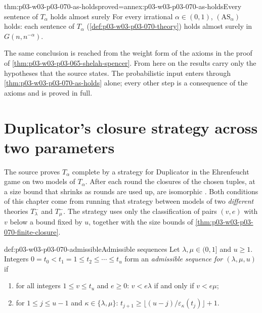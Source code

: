 \begin{hbtheorem}{thm:p03-w03-p03-070-as-holds}{proved=annex:p03-w03-p03-070-as-holds}{Every sentence of \(T_\alpha\) holds almost surely}
For every irrational \(\alpha\in(0,1)\), \((\mathrm{AS}_\alpha)\) holds: each
sentence of \(T_\alpha\) (\cref{def:p03-w03-p03-070-theory}) holds almost
surely in \(G(n,n^{-\alpha})\).
\end{hbtheorem}

The same conclusion is reached from the weight form of the axioms in the
proof of \cref{thm:p03-w03-p03-065-shelah-spencer}.  From here on the results
carry only the hypotheses that the source states.  The probabilistic input
enters through \cref{thm:p03-w03-p03-070-as-holds} alone; every other step is
a consequence of the axioms and is proved in full.

\section{Duplicator's closure strategy across two parameters}
\label{sec:p03-w03-p03-070-strategy}

The source proves \(T_\alpha\) complete by a strategy for Duplicator in the
Ehrenfeucht game on two models of \(T_\alpha\).  After each round the
closures of the chosen tuples, at a size bound that shrinks as rounds are
used up, are isomorphic \cite[pp.~11--12]{Spencer2007LogicRandomStructuresAuthor}.
Both conditions of this chapter come from running that strategy between
models of two \emph{different} theories \(T^-_\lambda\) and \(T^-_\mu\).
The strategy uses only the classification of pairs \((v,e)\) with \(v\)
below a bound fixed by \(u\), together with the size bounds of
\cref{thm:p03-w03-p03-070-finite-closure}.

\begin{hbdefinition}{def:p03-w03-p03-070-admissible}{Admissible sequences}
Let \(\lambda,\mu\in(0,1]\) and \(u\geq1\).  Integers
\(0=t_0<t_1=1\leq t_2\leq\cdots\leq t_u\) form an \emph{admissible sequence
for \((\lambda,\mu,u)\)} if
\begin{enumerate}
\item[(A1)] for all integers \(1\leq v\leq t_u\) and \(e\geq0\):
      \(v<e\lambda\) if and only if \(v<e\mu\);
\item[(A2)] for \(1\leq j\leq u-1\) and \(\kappa\in\{\lambda,\mu\}\):
      \(t_{j+1}\geq\lfloor(u-j)/\varepsilon_\kappa(t_j)\rfloor+1\).
\end{enumerate}
\end{hbdefinition}

